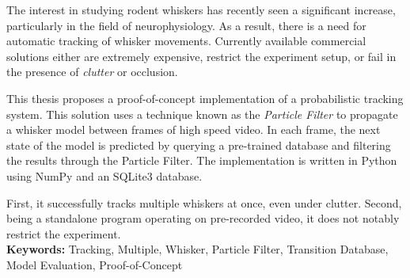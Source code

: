 The interest in studying rodent whiskers has recently seen a significant increase, 
particularly in the field of neurophysiology. As a result, there is a need for automatic 
tracking of whisker movements. Currently available commercial solutions either are 
extremely expensive, restrict the experiment setup, or fail in the presence of 
\emph{clutter} or occlusion. 

This thesis proposes a proof-of-concept implementation of a probabilistic tracking system. 
This solution uses a technique known as the \emph{Particle Filter} to propagate a whisker model between frames of high speed video. 
In each frame, the next state of the model is predicted by querying a pre-trained database and filtering the results 
through the Particle Filter. The implementation is written in Python using NumPy and an SQLite3 database.

First, it successfully tracks multiple whiskers at once, even under clutter. 
Second, being a standalone program operating on pre-recorded video, it does not notably restrict the experiment.\\

\textbf{Keywords:} Tracking, Multiple, Whisker, Particle Filter, Transition Database, Model Evaluation, Proof-of-Concept
